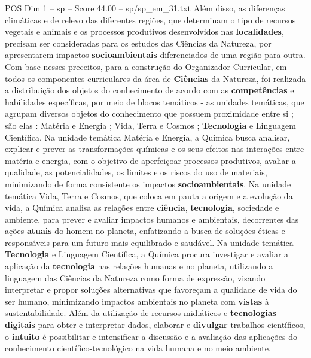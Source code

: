 \begin{textsample}{POS Dim 1 – sp – Score 44.00 – sp/sp\_em\_31.txt}
Além disso, as diferenças climáticas e de relevo das diferentes regiões, que determinam o tipo de recursos vegetais e animais e os processos produtivos desenvolvidos nas \textbf{localidades}, precisam ser consideradas para os estudos das Ciências da Natureza, por apresentarem impactos \textbf{socioambientais} diferenciados de uma região para outra.
Com base nesses preceitos, para a construção do Organizador Curricular, em todos os componentes curriculares da área de \textbf{Ciências} da Natureza, foi realizada a distribuição dos objetos do conhecimento de acordo com as \textbf{competências} e habilidades específicas, por meio de blocos temáticos - as unidades temáticas, que agrupam diversos objetos do conhecimento que possuem proximidade entre si ; são elas : Matéria e Energia ; Vida, Terra e Cosmos ; \textbf{Tecnologia} e Linguagem Científica.
Na unidade temática Matéria e Energia, a Química busca analisar, explicar e prever as transformações químicas e os seus efeitos nas interações entre matéria e energia, com o objetivo de aperfeiçoar processos produtivos, avaliar a qualidade, as potencialidades, os limites e os riscos do uso de materiais, minimizando de forma consistente os impactos \textbf{socioambientais}.
Na unidade temática Vida, Terra e Cosmos, que coloca em pauta a origem e a evolução da vida, a Química analisa as relações entre \textbf{ciência}, \textbf{tecnologia}, sociedade e ambiente, para prever e avaliar impactos humanos e ambientais, decorrentes das ações \textbf{atuais} do homem no planeta, enfatizando a busca de soluções éticas e responsáveis para um futuro mais equilibrado e saudável.
Na unidade temática \textbf{Tecnologia} e Linguagem Científica, a Química procura investigar e avaliar a aplicação da \textbf{tecnologia} nas relações humanas e no planeta, utilizando a linguagem das Ciências da Natureza como forma de expressão, visando interpretar e propor soluções alternativas que favoreçam a qualidade de vida do ser humano, minimizando impactos ambientais no planeta com \textbf{vistas} à sustentabilidade.
Além da utilização de recursos midiáticos e \textbf{tecnologias} \textbf{digitais} para obter e interpretar dados, elaborar e \textbf{divulgar} trabalhos científicos, o \textbf{intuito} é possibilitar e intensificar a discussão e a avaliação das aplicações do conhecimento científico-tecnológico na vida humana e no meio ambiente.

\end{textsample}
